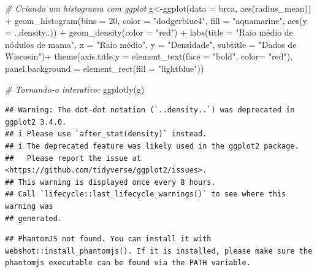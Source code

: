 \documentclass[
]{book}
\newenvironment{Shaded}{\begin{snugshade}}{\end{snugshade}}
\newcommand{\AttributeTok}[1]{\textcolor[rgb]{0.77,0.63,0.00}{#1}}
\newcommand{\CommentTok}[1]{\textcolor[rgb]{0.56,0.35,0.01}{\textit{#1}}}
\newcommand{\DecValTok}[1]{\textcolor[rgb]{0.00,0.00,0.81}{#1}}
\newcommand{\FunctionTok}[1]{\textcolor[rgb]{0.00,0.00,0.00}{#1}}
\newcommand{\NormalTok}[1]{#1}
\newcommand{\OtherTok}[1]{\textcolor[rgb]{0.56,0.35,0.01}{#1}}
\newcommand{\SpecialCharTok}[1]{\textcolor[rgb]{0.00,0.00,0.00}{#1}}
\newcommand{\StringTok}[1]{\textcolor[rgb]{0.31,0.60,0.02}{#1}}
\begin{document}
\begin{Shaded}
\begin{Highlighting}[]
\CommentTok{\# Criando um histograma com ggplot}
\NormalTok{g}\OtherTok{\textless{}{-}}\FunctionTok{ggplot}\NormalTok{(}\AttributeTok{data =}\NormalTok{ brca, }\FunctionTok{aes}\NormalTok{(radius\_mean)) }\SpecialCharTok{+}
  \FunctionTok{geom\_histogram}\NormalTok{(}\AttributeTok{bins =} \DecValTok{20}\NormalTok{, }\AttributeTok{color =} \StringTok{"dodgerblue4"}\NormalTok{, }\AttributeTok{fill =} \StringTok{"aquamarine"}\NormalTok{,}
                 \FunctionTok{aes}\NormalTok{(}\AttributeTok{y =}\NormalTok{ ..density..)) }\SpecialCharTok{+}
  \FunctionTok{geom\_density}\NormalTok{(}\AttributeTok{color =} \StringTok{"red"}\NormalTok{) }\SpecialCharTok{+}
  \FunctionTok{labs}\NormalTok{(}\AttributeTok{title =} \StringTok{"Raio médio de nódulos de mama"}\NormalTok{,}
       \AttributeTok{x =} \StringTok{"Raio médio"}\NormalTok{,}
       \AttributeTok{y =} \StringTok{"Densidade"}\NormalTok{,}
       \AttributeTok{subtitle =} \StringTok{"Dados de Wiscosin"}\NormalTok{)}\SpecialCharTok{+}
  \FunctionTok{theme}\NormalTok{(}\AttributeTok{axis.title.y =} \FunctionTok{element\_text}\NormalTok{(}\AttributeTok{face =} \StringTok{"bold"}\NormalTok{, }\AttributeTok{color=} \StringTok{"red"}\NormalTok{),}
        \AttributeTok{panel.background =} \FunctionTok{element\_rect}\NormalTok{(}\AttributeTok{fill =} \StringTok{"lightblue"}\NormalTok{))}

\CommentTok{\# Tornando{-}o interativo:}
\FunctionTok{ggplotly}\NormalTok{(g)}
\end{Highlighting}
\end{Shaded}

\begin{verbatim}
## Warning: The dot-dot notation (`..density..`) was deprecated in ggplot2 3.4.0.
## i Please use `after_stat(density)` instead.
## i The deprecated feature was likely used in the ggplot2 package.
##   Please report the issue at <https://github.com/tidyverse/ggplot2/issues>.
## This warning is displayed once every 8 hours.
## Call `lifecycle::last_lifecycle_warnings()` to see where this warning was
## generated.
\end{verbatim}

\begin{verbatim}
## PhantomJS not found. You can install it with webshot::install_phantomjs(). If it is installed, please make sure the phantomjs executable can be found via the PATH variable.
\end{verbatim}
\end{document}
